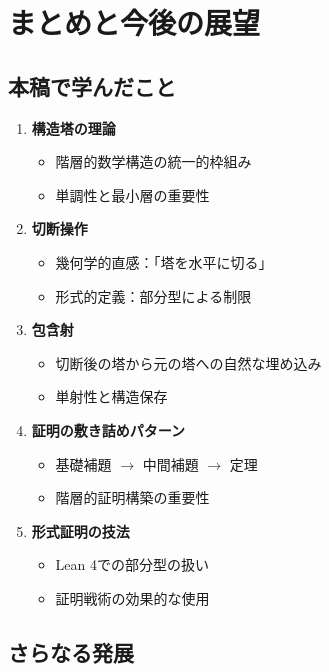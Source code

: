 \documentclass[a4paper,11pt]{article}
\theoremstyle{definition}
\begin{document}
\section{まとめと今後の展望}

\subsection{本稿で学んだこと}

\begin{enumerate}
    \item \textbf{構造塔の理論}
    \begin{itemize}
        \item 階層的数学構造の統一的枠組み
        \item 単調性と最小層の重要性
    \end{itemize}
    
    \item \textbf{切断操作}
    \begin{itemize}
        \item 幾何学的直感：「塔を水平に切る」
        \item 形式的定義：部分型による制限
    \end{itemize}
    
    \item \textbf{包含射}
    \begin{itemize}
        \item 切断後の塔から元の塔への自然な埋め込み
        \item 単射性と構造保存
    \end{itemize}
    
    \item \textbf{証明の敷き詰めパターン}
    \begin{itemize}
        \item 基礎補題 $\to$ 中間補題 $\to$ 定理
        \item 階層的証明構築の重要性
    \end{itemize}
    
    \item \textbf{形式証明の技法}
    \begin{itemize}
        \item Lean 4での部分型の扱い
        \item 証明戦術の効果的な使用
    \end{itemize}
\end{enumerate}

\subsection{さらなる発展}
\end{document}

